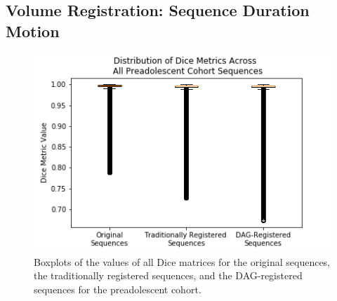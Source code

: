 
%

\subsection{Volume Registration: Sequence Duration Motion}

\begin{figure}[]
\centering
\includegraphics[height=0.3\textheight]{6/figures/preads-dice-box.png}
\caption{Boxplots of the values of all Dice matrices for the original sequences, the traditionally registered sequences, and the DAG-registered sequences for the preadolescent cohort.}
\label{fig:preads-dice-box}
\end{figure}

